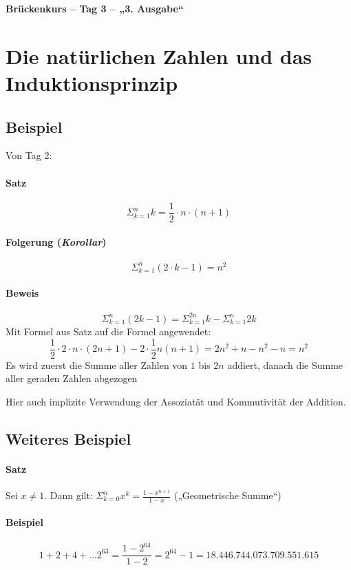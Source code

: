 \documentclass[14pt,a4paper]{article}
\begin{document}
	\begin{center}
		\Huge\textbf{Brückenkurs – Tag 3 – „3. Ausgabe“}
	\end{center}
	\par
	
	\section{Die natürlichen Zahlen und das Induktionsprinzip}
	\subsection{Beispiel}
		Von Tag 2:
			\paragraph{Satz}
				$$ \Sigma_{k=1}^{n} k = \frac{1}{2} \cdot n \cdot (n + 1) $$
			\paragraph{Folgerung (\textit{Korollar})}
				$$ \Sigma_{k=1}^{n} ( 2 \cdot k -1 ) = n^2 $$
			\paragraph{Beweis}
				$$ \Sigma_{k=1}^{n} (2k-1) = \Sigma_{k=1}^{2n} k - \Sigma_{k=1}^{n} 2k $$
				Mit Formel aus Satz auf die Formel angewendet:
				$$ \frac{1}{2} \cdot 2 \cdot n \cdot (2n+1) -2 \cdot \frac{1}{2} n(n+1) = 2n^2 + n - n^2 -n = n^2 $$
				Es wird zuerst die Summe aller Zahlen von $1$ bis $2n$ addiert, danach die Summe aller geraden Zahlen abgezogen

				Hier auch implizite Verwendung der Assoziatät und Kommutivität der Addition.

	\subsection{Weiteres Beispiel}
		\paragraph{Satz} Sei $ x \neq 1 $. Dann gilt: $\Sigma_{k=0}^{n} x^k = \frac{1-x^{n+1}}{1-x} $ („Geometrische Summe“)
		\paragraph{Beispiel}
			$$ 1 + 2 + 4 + \dots 2^{63} = \frac{1-2^{64}}{1-2} = 2^{64} - 1 = 18.446.744.073.709.551.615 $$
\end{document}
